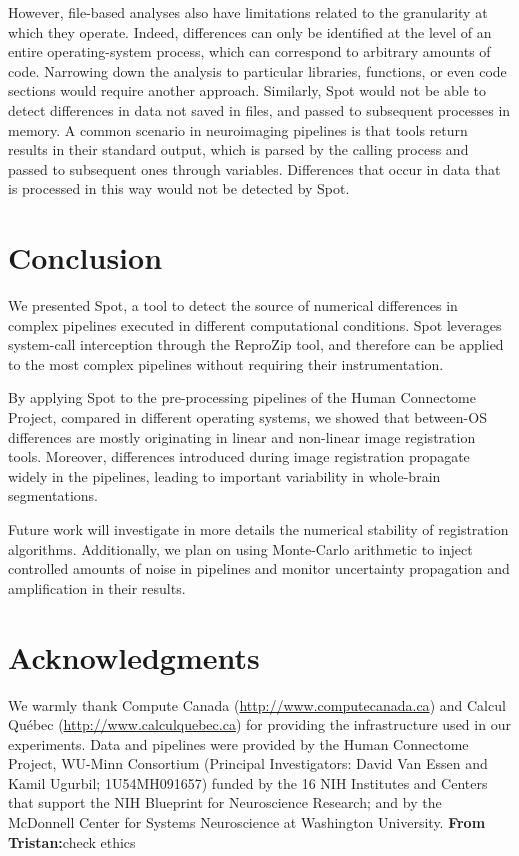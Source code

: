\documentclass[a4paper,num-refs]{oup-contemporary}
\newcommand{\reprozip}[0]{ReproZip\xspace}
\newcommand{\tristan}[1]{\color{orange}\textbf{From Tristan:}#1\color{black}}
\newcommand{\toolname}[0]{Spot\xspace}
\begin{document}
However, file-based analyses also have limitations related to the
granularity at which they operate. Indeed, differences can only be
identified at the level of an entire operating-system process, which can
correspond to arbitrary amounts of code. Narrowing down the analysis to
particular libraries, functions, or even code sections would require
another approach. Similarly, \toolname would not be able to detect
differences in data not saved in files, and passed to subsequent processes
in memory. A common scenario in neuroimaging pipelines is that tools return
results in their standard output, which is parsed by the calling process
and passed to subsequent ones through variables. Differences that occur in data 
that is processed in this way would not be detected by \toolname.  

\section{Conclusion}

We presented \toolname, a tool to detect the source of numerical
differences in complex pipelines executed in different computational
conditions. \toolname leverages system-call interception through the
\reprozip tool, and therefore can be applied to the most complex pipelines
without requiring their instrumentation. 

By applying \toolname to the pre-processing pipelines of the Human
Connectome Project, compared in different operating systems, we showed that
between-OS differences are mostly originating in linear and non-linear
image registration tools. Moreover, differences introduced during image
registration propagate widely in the pipelines, leading to important
variability in whole-brain segmentations.

Future work will investigate in more details the numerical stability of
registration algorithms. Additionally, we plan on using Monte-Carlo arithmetic
to inject controlled amounts of noise in pipelines and monitor
uncertainty propagation and amplification in their results.

\section{Acknowledgments}

We warmly thank Compute Canada (\url{http://www.computecanada.ca}) and Calcul
Qu\'ebec (\url{http://www.calculquebec.ca}) for providing the infrastructure used in our experiments.
Data and pipelines were provided by the Human Connectome Project, WU-Minn 
Consortium (Principal Investigators: David Van Essen and Kamil Ugurbil; 
1U54MH091657) funded by the 16 NIH Institutes and Centers that support 
the NIH Blueprint for Neuroscience Research; and by the McDonnell 
Center for Systems Neuroscience at Washington University.
\tristan{check ethics}



\end{document}
